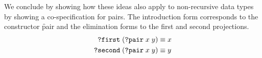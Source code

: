 We conclude by showing how these ideas also apply to
non-recursive data types by showing a co-specification for pairs.
%
The introduction form corresponds to the constructor
\f{pair} and the elimination forms to the first and
second projections.
%
\begin{align*}
  \texttt{?first}\;(\texttt{?pair}\;x\;y) &\equiv x\\
  \texttt{?second}\;(\texttt{?pair}\;x\;y) &\equiv y\\
\end{align*}
